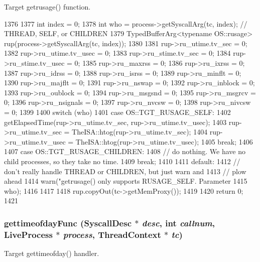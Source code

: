 Target getrusage() function. 


\begin{DoxyCode}
1376 {
1377     int index = 0;
1378     int who = process->getSyscallArg(tc, index); // THREAD, SELF, or CHILDREN
1379     TypedBufferArg<typename OS::rusage> rup(process->getSyscallArg(tc, index));
1380 
1381     rup->ru_utime.tv_sec = 0;
1382     rup->ru_utime.tv_usec = 0;
1383     rup->ru_stime.tv_sec = 0;
1384     rup->ru_stime.tv_usec = 0;
1385     rup->ru_maxrss = 0;
1386     rup->ru_ixrss = 0;
1387     rup->ru_idrss = 0;
1388     rup->ru_isrss = 0;
1389     rup->ru_minflt = 0;
1390     rup->ru_majflt = 0;
1391     rup->ru_nswap = 0;
1392     rup->ru_inblock = 0;
1393     rup->ru_oublock = 0;
1394     rup->ru_msgsnd = 0;
1395     rup->ru_msgrcv = 0;
1396     rup->ru_nsignals = 0;
1397     rup->ru_nvcsw = 0;
1398     rup->ru_nivcsw = 0;
1399 
1400     switch (who) {
1401       case OS::TGT_RUSAGE_SELF:
1402         getElapsedTime(rup->ru_utime.tv_sec, rup->ru_utime.tv_usec);
1403         rup->ru_utime.tv_sec = TheISA::htog(rup->ru_utime.tv_sec);
1404         rup->ru_utime.tv_usec = TheISA::htog(rup->ru_utime.tv_usec);
1405         break;
1406 
1407       case OS::TGT_RUSAGE_CHILDREN:
1408         // do nothing.  We have no child processes, so they take no time.
1409         break;
1410 
1411       default:
1412         // don't really handle THREAD or CHILDREN, but just warn and
1413         // plow ahead
1414         warn("getrusage() only supports RUSAGE_SELF.  Parameter %
1415              who);
1416     }
1417 
1418     rup.copyOut(tc->getMemProxy());
1419 
1420     return 0;
1421 }
\end{DoxyCode}
\hypertarget{syscall__emul_8hh_aa8d95336bb3f10b1d9416b32fea82c9d}{
\subsubsection[{gettimeofdayFunc}]{ gettimeofdayFunc ({\bf SyscallDesc} $\ast$ {\em desc}, \/  int {\em callnum}, \/  {\bf LiveProcess} $\ast$ {\em process}, \/  {\bf ThreadContext} $\ast$ {\em tc})}}
\label{syscall__emul_8hh_aa8d95336bb3f10b1d9416b32fea82c9d}


Target gettimeofday() handler. 


